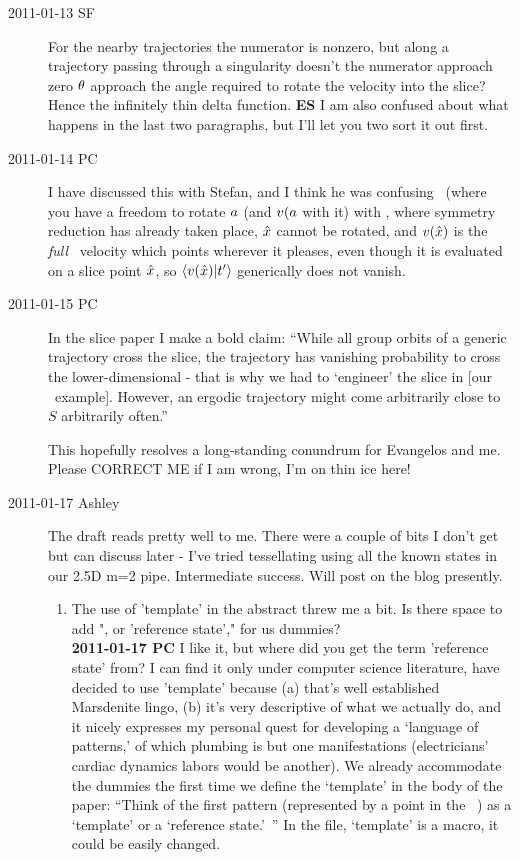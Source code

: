\begin{description}
\item[2011-01-13 SF]
For the nearby trajectories the numerator is nonzero, but along a
trajectory passing through a singularity doesn't the numerator approach
zero $\theta$ approach the angle required to rotate the velocity into
the slice? Hence the infinitely thin delta function. {\bf ES} I am also
confused about what happens in the last two paragraphs, but I'll let you
two sort it out first.

\item[2011-01-14 PC] I have discussed this with Stefan, and I think he
was confusing \mframes\ (where you have a freedom to rotate $a$ (and
$v(a$ with it) with \mslices, where symmetry reduction has already
taken place, $\hat{x}$ cannot be rotated, and $v(\hat{x})$ is the
\emph{full} \statesp\ velocity which points wherever it pleases, even
though it is evaluated on a slice point $\hat{x}$, so
${\braket{\vel(\sspRed)}{\sliceTan{}}}$ generically does not vanish.


\item[2011-01-15 PC] In the slice paper I make a bold claim:
``While all group orbits of a  generic trajectory cross the slice, the
trajectory has vanishing probability to cross the lower-dimensional
{\sset} - that is why we had to `engineer' the slice in [our \cLe\ example].
However, an ergodic trajectory  might come arbitrarily close to  $S$
arbitrarily often.''

This hopefully resolves a long-standing conundrum for Evangelos and me.
Please CORRECT ME if I am wrong, I'm on thin ice here!



\item[2011-01-17 Ashley]
The draft reads pretty well to me.  There were a couple of bits I don't
get but can discuss later - I've tried tessellating using all the known
states in our 2.5D m=2 pipe.  Intermediate success.  Will post on the
blog presently.

\begin{enumerate}
  \item The use of 'template' in the abstract threw me a bit.  Is there
  space to add ", or 'reference state'," for us dummies?
    \\
  {\bf 2011-01-17 PC} I like it, but where did you get
  the term 'reference state' from? I  can find it only under computer science
  literature, have decided to use 'template'  because (a) that's well
  established Marsdenite lingo,
  (b) it's very descriptive of what we actually do, and it nicely
  expresses my personal quest for developing a `language of patterns,'
  of which plumbing is but one manifestations (electricians'
  cardiac dynamics labors would be another). We already
  accommodate the dummies the
  first time we define the `template' in the body of the paper:
  ``Think of the first pattern
(represented by a point {\slicep} in the \statesp\  \pS) as a
`template' or a
`reference state.'~''
In the file, `template' is a macro, it could be easily changed.


\end{enumerate}
\end{description}
